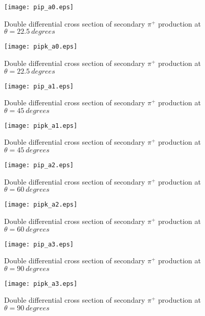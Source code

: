 \documentclass[12pt]{article}
\begin{document}
\clearpage

\begin{figure}[htbp]
\caption{Double differential cross section of secondary $\pi^+$ production at $\theta = 22.5~degrees$}
\label{figpip0} 
\centerline{\texttt{[image: pip\_a0.eps]}}
\end{figure}

\begin{figure}[htbp]
\caption{Double differential cross section of secondary $\pi^+$ production at $\theta = 22.5~degrees$}
\label{figpipk0} 
\centerline{\texttt{[image: pipk\_a0.eps]}}
\end{figure}


\begin{figure}[htbp]
\caption{Double differential cross section of secondary $\pi^+$ production at $\theta = 45~degrees$}
\label{figpip1} 
\centerline{\texttt{[image: pip\_a1.eps]}}
\end{figure}

\begin{figure}[htbp]
\caption{Double differential cross section of secondary $\pi^+$ production at $\theta = 45~degrees$}
\label{figpipk1} 
\centerline{\texttt{[image: pipk\_a1.eps]}}
\end{figure}

\begin{figure}[htbp]
\caption{Double differential cross section of secondary $\pi^+$ production at $\theta = 60~degrees$}
\label{figpip2} 
\centerline{\texttt{[image: pip\_a2.eps]}}
\end{figure}

\begin{figure}[htbp]
\caption{Double differential cross section of secondary $\pi^+$ production at $\theta = 60~degrees$}
\label{figpipk2} 
\centerline{\texttt{[image: pipk\_a2.eps]}}
\end{figure}

\begin{figure}[htbp]
\caption{Double differential cross section of secondary $\pi^+$ production at $\theta = 90~degrees$}
\label{figpip3} 
\centerline{\texttt{[image: pip\_a3.eps]}}
\end{figure}

\begin{figure}[htbp]
\caption{Double differential cross section of secondary $\pi^+$ production at $\theta = 90~degrees$}
\label{figpipk3} 
\centerline{\texttt{[image: pipk\_a3.eps]}}
\end{figure}
\end{document}
